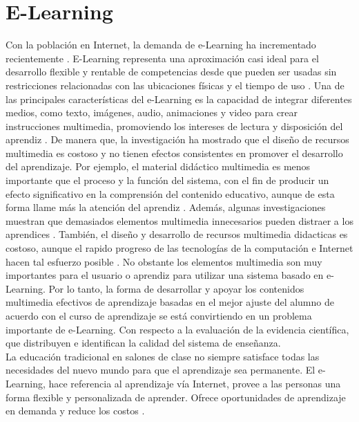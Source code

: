 \section{E-Learning}

Con la población en Internet, la demanda de e-Learning ha incrementado recientemente \cite{Chang}. E-Learning representa una aproximación casi ideal para el desarrollo flexible y rentable de competencias desde que pueden ser usadas sin restricciones relacionadas con las ubicaciones físicas y el tiempo de uso \cite{Cukusic}. Una de las principales características del e-Learning es la capacidad de integrar diferentes medios, como texto, imágenes, audio, animaciones y video para crear instrucciones multimedia, promoviendo los intereses de lectura y disposición del aprendiz \cite{Vichuda}. De manera que, la investigación ha mostrado que el diseño de recursos multimedia es costoso y no tienen efectos consistentes en promover el desarrollo del aprendizaje. Por ejemplo, el material didáctico multimedia es menos importante que el proceso y la función del sistema, con el fin de producir un efecto significativo en la comprensión del contenido educativo, aunque de esta forma llame más la atención del aprendiz \cite{Bartscha}. Además, algunas investigaciones muestran que demasiados elementos multimedia innecesarios pueden distraer a los aprendices \cite{Clark}. También, el diseño y desarrollo de recursos multimedia didacticas es costoso, aunque el rapido progreso de las tecnologías de la computación e Internet hacen tal esfuerzo posible \cite{Sun}. No obstante los elementos multimedia son muy importantes para el usuario o aprendiz para utilizar una sistema basado en e-Learning. Por lo tanto, la forma de desarrollar y apoyar los contenidos multimedia efectivos de aprendizaje basadas en el mejor ajuste del alumno de acuerdo con el curso de aprendizaje se está convirtiendo en un problema importante de e-Learning. Con respecto a la evaluación de la evidencia científica, que distribuyen e identifican la calidad del sistema de enseñanza. \\

La educación tradicional en salones de clase no siempre satisface todas las necesidades del nuevo mundo para que el aprendizaje sea permanente. El e-Learning, hace referencia al aprendizaje vía Internet, provee a las personas una forma flexible y personalizada de aprender. Ofrece oportunidades de aprendizaje en demanda y reduce los costos \cite{Zhang}. \\

